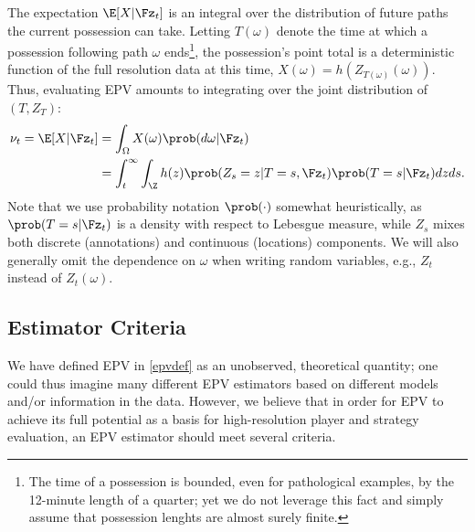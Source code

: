 \documentclass[EPV_JASA.tex]{subfiles}
\begin{document}
The expectation $\E[X|\Fz_t]$ is an integral over the distribution of future paths the current possession can take. Letting $T(\omega)$ denote the time at which a possession following path $\omega$ ends\footnote{The time of a possession is bounded, even for pathological examples, by the 12-minute length of a quarter; yet we do not leverage this fact and simply assume that possession lenghts are almost surely finite.}, the possession's point total is a deterministic function of the full resolution data at this time, $X(\omega) = h(Z_{T(\omega)}(\omega))$. Thus, evaluating EPV amounts to integrating over the joint distribution of $(T, Z_T)$:
\begin{align} \label{epvdef}
\nu_t = \E[X|\Fz_t] &= \int_{\Omega} X(\omega) \prob(d\omega | \Fz_t) \nonumber \\
 &= \int_t^{\infty} \int_{\Z} h(z) \prob(Z_s = z | T=s, \Fz_t) \prob(T=s | \Fz_t) dz ds.
\end{align}
Note that we use probability notation $\prob(\cdot)$ somewhat heuristically, as $\prob(T=s|\Fz_t)$ is a density with respect to Lebesgue measure, while $Z_s$ mixes both discrete (annotations) and continuous (locations) components. We will also generally omit the dependence on $\omega$ when writing random variables, e.g., $Z_t$ instead of $Z_t(\omega)$.


\subsection{Estimator Criteria}
\label{subsec:multiCrit}
We have defined EPV in \eqref{epvdef} as an unobserved, theoretical quantity; one could thus imagine many different EPV estimators based on different models and/or information in the data. However, we believe that in order for EPV to achieve its full potential as a basis for high-resolution player and strategy evaluation, an EPV estimator should meet several criteria.
\end{document}
